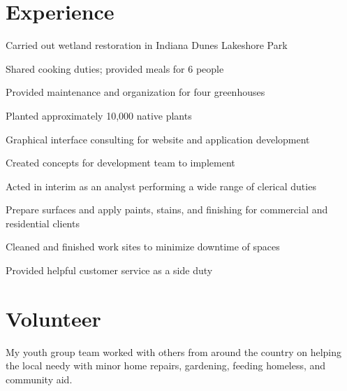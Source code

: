 \documentclass[]{resume-openfont}
\begin{document}
\begin{minipage}[t]{0.66\textwidth} 


\section{Experience}

\vspace{\topsep} %
\begin{tightemize}
\item Carried out wetland restoration in Indiana Dunes Lakeshore Park
\item Shared cooking duties; provided meals for 6 people
\item Provided maintenance and organization for four greenhouses
\item Planted approximately 10,000 native plants
\end{tightemize}
\sectionsep

\begin{tightemize}
\item Graphical interface consulting for website and application development
\item Created concepts for development team to implement
\item Acted in interim as an analyst performing a wide range of clerical duties
\end{tightemize}
\sectionsep

\begin{tightemize}
\item Prepare surfaces and apply paints, stains, and finishing for commercial and residential clients
\item Cleaned and finished work sites to minimize downtime of spaces
\item Provided helpful customer service as a side duty
\end{tightemize}
\sectionsep


\section{Volunteer}
My youth group team worked with others from around the country on helping the local needy with minor home repairs, gardening, feeding homeless, and community aid.
\sectionsep

\end{minipage} 
\end{document}
